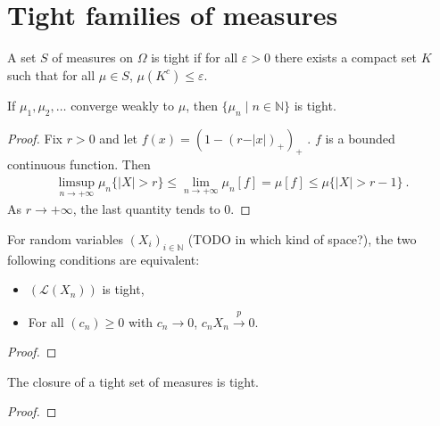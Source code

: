 \chapter{Tight families of measures}

\begin{definition}\label{def:tight}
 \leanok
A set $S$ of measures on $\Omega$ is tight if for all $\varepsilon > 0$ there exists a compact set $K$ such that for all $\mu \in S$, $\mu(K^c) \le \varepsilon$.
\end{definition}

\begin{lemma}\label{lem:tight_of_cvg}
If $\mu_1, \mu_2, \ldots$ converge weakly to $\mu$, then $\{\mu_n \mid n \in \mathbb{N}\}$ is tight.
\end{lemma}

\begin{proof}
Fix $r > 0$ and let $f(x) = (1 - (r - \vert x \vert)_+)_+$ . $f$ is a bounded continuous function. Then
\begin{align*}
\limsup_{n \to +\infty} \mu_n\{\vert X \vert > r\}
\le \lim_{n \to +\infty} \mu_n\left[ f \right]
= \mu[f]
\le \mu\{\vert X \vert > r - 1\} \: .
\end{align*}
As $r \to +\infty$, the last quantity tends to 0.
\end{proof}

\begin{lemma}\label{tight_iff_cvg_probability}
For random variables $(X_i)_{i \in \mathbb{N}}$ (TODO in which kind of space?), the two following conditions are equivalent:
\begin{itemize}
	\item $(\mathcal L(X_n))$ is tight,
	\item For all $(c_n) \ge 0$ with $c_n \to 0$, $c_n X_n \xrightarrow{p} 0$.
\end{itemize}
\end{lemma}

\begin{proof}

\end{proof}

\begin{lemma}\label{tight_closure}
The closure of a tight set of measures is tight.
\end{lemma}

\begin{proof}
\end{proof}

